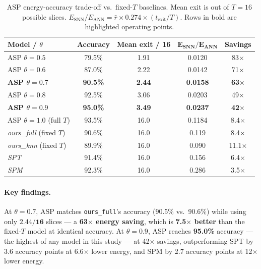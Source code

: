 \documentclass[11pt,a4paper]{article}
\begin{document}
\begin{table}[H]
  \centering
  \caption{ASP energy-accuracy trade-off vs.\ fixed-$T$ baselines.
           Mean exit is out of $T{=}16$ possible slices.
           $E_\text{SNN}/E_\text{ANN} = \bar{r} \times 0.274 \times (t_\text{exit}/T)$.
           Rows in bold are highlighted operating points.}
  \label{tab:pareto}
  \begin{tabular}{lcccc}
    \toprule
    \textbf{Model / $\theta$} & \textbf{Accuracy} & \textbf{Mean exit / 16}
      & $\boldsymbol{E_\text{SNN}/E_\text{ANN}}$ & \textbf{Savings} \\
    \midrule
    ASP $\theta{=}0.5$        & 79.5\%  & 1.91  & 0.0120 & 83$\times$ \\
    ASP $\theta{=}0.6$        & 87.0\%  & 2.22  & 0.0142 & 71$\times$ \\
    \textbf{ASP $\theta{=}0.7$} & \textbf{90.5\%} & \textbf{2.44} & \textbf{0.0158} & \textbf{63$\times$} \\
    ASP $\theta{=}0.8$        & 92.5\%  & 3.06  & 0.0203 & 49$\times$ \\
    \textbf{ASP $\theta{=}0.9$} & \textbf{95.0\%} & \textbf{3.49} & \textbf{0.0237} & \textbf{42$\times$} \\
    ASP $\theta{=}1.0$ (full $T$) & 93.5\% & 16.0 & 0.1184 & 8.4$\times$ \\
    \midrule
    \textit{ours\_full} (fixed $T$) & 90.6\%  & 16.0 & 0.119 & 8.4$\times$ \\
    \textit{ours\_knn}  (fixed $T$) & 89.9\%  & 16.0 & 0.090 & 11.1$\times$ \\
    \textit{SPT}~\cite{spt}         & 91.4\%  & 16.0 & 0.156 & 6.4$\times$ \\
    \textit{SPM}~\cite{spm2025}     & 92.3\%  & 16.0 & 0.286 & 3.5$\times$ \\
    \bottomrule
  \end{tabular}
\end{table}

\paragraph{Key findings.}
At $\theta{=}0.7$, ASP matches \texttt{ours\_full}'s accuracy (90.5\% vs.\
90.6\%) while using only $\mathbf{2.44/16}$ slices --- a \textbf{63$\times$
energy saving}, which is \textbf{7.5$\times$ better} than the fixed-$T$ model
at identical accuracy. At $\theta{=}0.9$, ASP reaches \textbf{95.0\%} accuracy
--- the highest of any model in this study --- at 42$\times$ savings,
outperforming SPT by 3.6 accuracy points at 6.6$\times$ lower energy, and
SPM by 2.7 accuracy points at 12$\times$ lower energy.
\end{document}
